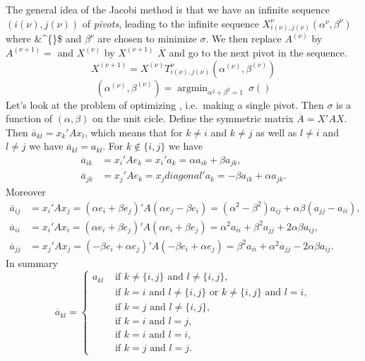 \documentclass[
  12pt,
]{article}
\begin{document}
The general idea of the Jacobi method is that we have an infinite sequence
\((i(\nu),j(\nu))\) of \emph{pivots}, leading to the infinite sequence
\(X^{\nu}_{i(\nu),j(\nu)}(\alpha^{\nu},\beta^{\nu})\) where \&\alpha\^{}\{\nu\}\$ and \(\beta^{\nu}\)
are chosen to minimize \(\sigma\). We then replace \(A^{(\nu)}\) by
\(A^{(\nu+1)}=\) and \(X^{(\nu)}\) by \(X^{(\nu+1)}\)
\(\overline{X}\) and go to the next pivot in the sequence.
\[
X^{(\nu+1)}=X^{(\nu)}T^{\nu}_{i(\nu),j(\nu)}(\alpha^{(\nu)},\beta^{(\nu)})
\]
\[
(\alpha^{(\nu)},\beta^{(\nu)})=\mathop{\text{argmin}}_{\alpha^2+\beta^2=1}\ \sigma()
\]
Let's look at the problem of optimizing , i.e.~making a single pivot. Then \(\sigma\) is a function of \((\alpha,\beta)\) on the unit cicle. Define the symmetric matrix \(\overline{A}=X'AX\). Then \(\overline{a}_{kl}=x_k'Ax_l\),
which means that for \(k\not= i\) and \(k\not= j\) as well as \(l\not= i\) and \(l\not= j\) we have
\(\overline{a}_{kl}=a_{kl}\). For \(k\not\in\{i,j\}\) we have
\begin{align}
\overline{a}_{ik}&=x_i'Ae_k=x_i'a_k=\alpha a_{ik}+\beta a_{jk},\\
\overline{a}_{jk}&=x_j'Ae_k=x_jdiagonal'a_k=-\beta a_{ik}+\alpha a_{jk}.
\end{align}
Moreover
\begin{align}
\overline{a}_{ij}&=x_i'Ax_j=(\alpha e_i+\beta e_j)'A(\alpha e_j-\beta e_i)=
(\alpha^2-\beta^2)a_{ij}+\alpha\beta(a_{jj}-a_{ii}),\\
\overline{a}_{ii}&=x_i'Ax_i=(\alpha e_i+\beta e_j)'A(\alpha e_i+\beta e_j)=
\alpha^2a_{ii}+\beta^2a_{jj}+2\alpha\beta a_{ij},\\
\overline{a}_{jj}&=x_j'Ax_j=(-\beta e_i+\alpha e_j)'A(-\beta e_i+\alpha e_j)=
\beta^2a_{ii}+\alpha^2a_{jj}-2\alpha\beta a_{ij}.
\end{align}
In summary
\begin{equation}
\overline{a}_{kl}=\begin{cases}
a_{kl}&\text{ if }k\not=\{i,j\}\text{ and }l\not=\{i,j\},\\
&\text{ if }k=i\text{ and }l\not=\{i,j\}\text{ or }k\not=\{i,j\}\text{ and }l=i,\\
&\text{ if }k=j\text{ and }l\not=\{i,j\},\\
&\text{ if }k=i\text{ and }l=j,\\
&\text{ if }k=i\text{ and }l=i,\\
&\text{ if }k=j\text{ and }l=j.
\end{cases}
\end{equation}
\end{document}

